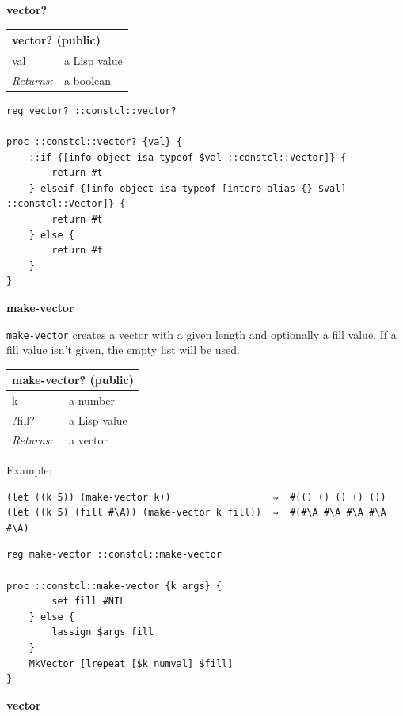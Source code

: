 \documentclass[twoside,9pt]{report}
\begin{document}
\textbf{vector?}

\begin{tabular}{ |l l| }
\hline
\multicolumn{2}{|l|}{vector? (public)} \\
\hline
val & a Lisp value \\
\textit{Returns:} & a boolean \\
\hline
\end{tabular}

\noindent\makebox[\linewidth]{\rule{\linewidth}{0.4pt}}
\begin{lstlisting}
reg vector? ::constcl::vector?
 
proc ::constcl::vector? {val} {
    ::if {[info object isa typeof $val ::constcl::Vector]} {
        return #t
    } elseif {[info object isa typeof [interp alias {} $val] ::constcl::Vector]} {
        return #t
    } else {
        return #f
    }
}
\end{lstlisting}
\noindent\makebox[\linewidth]{\rule{\linewidth}{0.4pt}}

\textbf{make-vector}


\texttt{make-vector} creates a vector with a given length and optionally a fill value. If a fill value isn't given, the empty list will be used.

\begin{tabular}{ |l l| }
\hline
\multicolumn{2}{|l|}{make-vector? (public)} \\
\hline
k & a number \\
?fill? & a Lisp value \\
\textit{Returns:} & a vector \\
\hline
\end{tabular}


Example:

\noindent\makebox[\linewidth]{\rule{\linewidth}{0.4pt}}
\begin{lstlisting}
(let ((k 5)) (make-vector k))                  ⇒  #(() () () () ())
(let ((k 5) (fill #\A)) (make-vector k fill))  ⇒  #(#\A #\A #\A #\A #\A)
\end{lstlisting}
\noindent\makebox[\linewidth]{\rule{\linewidth}{0.4pt}}
\noindent\makebox[\linewidth]{\rule{\linewidth}{0.4pt}}
\begin{lstlisting}
reg make-vector ::constcl::make-vector
 
proc ::constcl::make-vector {k args} {
        set fill #NIL
    } else {
        lassign $args fill
    }
    MkVector [lrepeat [$k numval] $fill]
}
\end{lstlisting}
\noindent\makebox[\linewidth]{\rule{\linewidth}{0.4pt}}

\textbf{vector}
\end{document}
